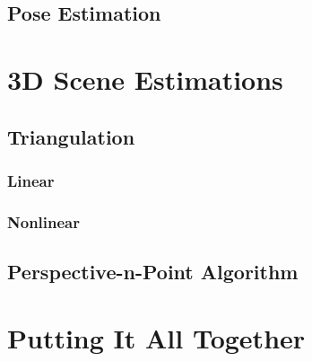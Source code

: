 \documentclass{book}
\begin{document}
        \section{Pose Estimation}

    \chapter{3D Scene Estimations}
        \section{Triangulation}
            \subsection{Linear}
            \subsection{Nonlinear}

        \section{Perspective-n-Point Algorithm}

    \chapter{Putting It All Together}
\end{document}
